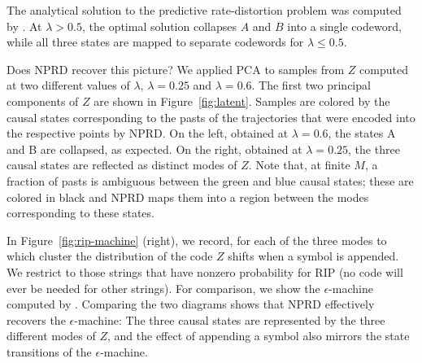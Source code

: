 \documentclass[entropy,article,submit,moreauthors,pdftex,10pt,a4paper]{Definitions/mdpi}
\begin{document}
The analytical solution to the predictive rate-distortion problem was computed by \citet{marzen-predictive-2016}.
At $\lambda > 0.5$, the optimal solution collapses $A$ and $B$ into a single codeword, while all three states are mapped to separate codewords for $\lambda \leq 0.5$.


Does NPRD recover this picture?
We applied PCA to samples from $Z$ computed at two different values of $\lambda$, $\lambda = 0.25$ and $\lambda = 0.6$. %
The first two principal components of $Z$ are shown in Figure~\ref{fig:latent}.
Samples are colored by the causal states corresponding to the pasts of the trajectories that were encoded into the respective points by NPRD.
On the left, obtained at $\lambda=0.6$, the states A and B are collapsed, as expected.
On the right, obtained at $\lambda=0.25$, the three causal states are reflected as distinct modes of $Z$.
Note that, at finite $M$, a fraction of pasts is ambiguous between the green and blue causal states; these are colored in black and NPRD maps them into a region between the modes corresponding to these states.

In Figure~\ref{fig:rip-machine} (right), we record, for each of the three modes to which cluster the distribution of the code $Z$ shifts when a symbol is appended.
We restrict to those strings that have nonzero probability for RIP (no code will ever be needed for other strings).
For comparison, we show the $\epsilon$-machine computed by \citet{marzen-predictive-2016}.
Comparing the two diagrams shows that NPRD effectively recovers the $\epsilon$-machine:
The three causal states are represented by the three different modes of $Z$, and the effect of appending a symbol also mirrors the state transitions of the $\epsilon$-machine.
\end{document}
